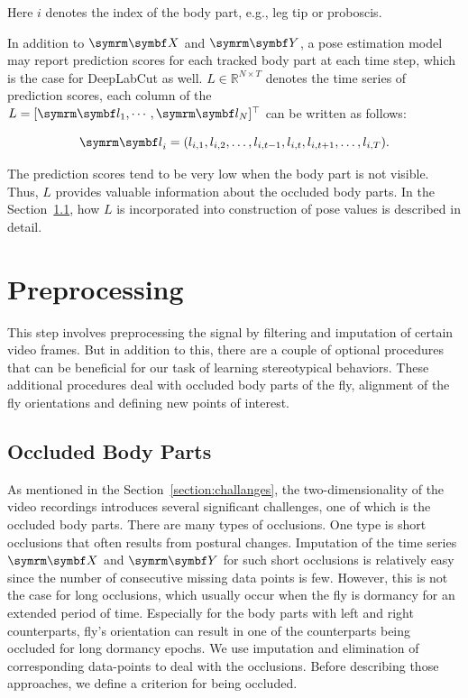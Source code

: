 Here $i$ denotes the index of the body part, e.g., leg tip or proboscis.

In addition to $\V{X}$ and $\V{Y}$, a pose estimation model may report prediction scores for each tracked body part at each time step, which is the case for DeepLabCut as well.
$L \in \mathbb{R}^{N \times T}$ denotes the time series of prediction scores, each column of the $L=[\V{l_1}, \cdots, \V{l_N}]^\top$ can be written as follows:

\begin{equation}
	\V{l}_i = (l_{i,1}, l_{i,2}, \dots, l_{i,t-1}, l_{i,t}, l_{i,t+1}, \dots, l_{i,T}).
\end{equation}

The prediction scores tend to be very low when the body part is not visible.
Thus, $L$ provides valuable information about the occluded body parts.
In the Section~\ref{section:dealing-with-occluded-body-parts}, how $L$ is incorporated into construction of pose values is described in detail.

\section{Preprocessing}
This step involves preprocessing the signal by filtering and imputation of certain video frames.
But in addition to this, there are a couple of optional procedures that can be beneficial for our task of learning stereotypical behaviors.
These additional procedures deal with occluded body parts of the fly, alignment of the fly orientations and defining new points of interest.

\subsection{Occluded Body Parts}\label{section:dealing-with-occluded-body-parts}
As mentioned in the Section~\ref{section:challanges}, the two-dimensionality of the video recordings introduces several significant challenges,  one of which is the occluded body parts.
There are many types of occlusions. One type is short occlusions that often results from postural changes. Imputation of the time series $\V{X}$ and $\V{Y}$ for such short occlusions is relatively easy since the number of consecutive missing data points is few.
However, this is not the case for long occlusions, which usually occur when the fly is dormancy for an extended period of time.
Especially for the body parts with left and right counterparts, fly's orientation can result in one of the counterparts being occluded for long dormancy epochs.
We use imputation and elimination of corresponding data-points to deal with the occlusions. Before describing those approaches, we define a criterion for being occluded.

